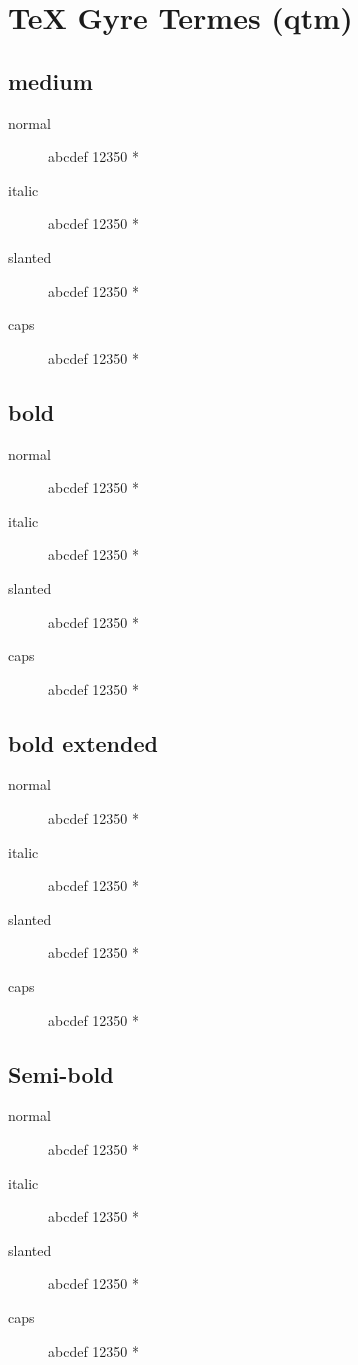 \section{\TeX{} Gyre Termes (qtm)}

\subsection{medium}
\begin{description}
    \item [normal]  abcdef 12350 *
    \item [italic]  abcdef 12350 *
    \item [slanted]  abcdef 12350 *
    \item [caps]  abcdef 12350 *
\end{description}
    
\subsection{bold}
\begin{description}
    \item [normal]  abcdef 12350 *
    \item [italic]  abcdef 12350 *
    \item [slanted]  abcdef 12350 *
    \item [caps]  abcdef 12350 *
\end{description}
    
\subsection{bold extended}
\begin{description}
    \item [normal]  abcdef 12350 *
    \item [italic]  abcdef 12350 *
    \item [slanted]  abcdef 12350 *
    \item [caps]  abcdef 12350 *
\end{description}

\subsection{Semi-bold}
\begin{description}
    \item [normal]  abcdef 12350 *
    \item [italic]  abcdef 12350 *
    \item [slanted]  abcdef 12350 *
    \item [caps]  abcdef 12350 *
\end{description}

